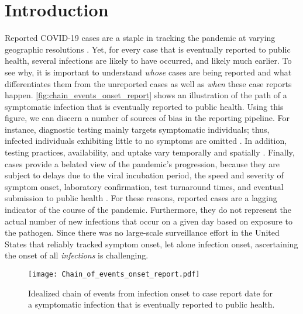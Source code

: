 \section{Introduction}
\label{sec:intro}

Reported COVID-19 cases are a staple in tracking the pandemic at varying
geographic resolutions \citep{dong2020interactive, nyt2020corona,
wp2020tracking}. Yet, for every case that is eventually reported to public
health, several infections are likely to have occurred, and likely much earlier. To
see why, it is important to understand \emph{whose} cases are being reported and
what differentiates them from the unreported cases as well as \emph{when} these
case reports happen. \autoref{fig:chain_events_onset_report} shows an
illustration of the path of a symptomatic infection that is eventually
reported to public health. Using this figure, we can discern a number of sources
of bias in the reporting pipeline. For instance, diagnostic testing mainly
targets symptomatic individuals; thus, infected individuals exhibiting little to
no symptoms are omitted \citep{cdc2022estimated}. In addition, testing
practices, availability, and uptake vary temporally and spatially
\citep{pitzer2021impact, ecdc2020strategies, hitchings2021usefulness}. Finally,
cases provide a belated view of the pandemic's progression, because they are
subject to delays due to the viral incubation period, the speed and severity of
symptom onset, laboratory confirmation, test turnaround times, and eventual
submission to public health \citep{pellis2021challenges, wash2020dash}. For
these reasons, reported cases are a lagging indicator of the course of the
pandemic. Furthermore, they do not represent the actual number of new infections
that occur on a given day based on exposure to the pathogen. Since there
was no large-scale surveillance effort in the United States that reliably
tracked symptom onset, let alone infection onset, ascertaining the onset of all
\emph{infections} is challenging.

\begin{figure}[!tb]
\centering
    \texttt{[image: Chain\_of\_events\_onset\_report.pdf]} 
    \caption{Idealized chain of events from infection onset to case report date 
    for a symptomatic infection that is eventually reported to public health.}
    \label{fig:chain_events_onset_report}
\end{figure}


